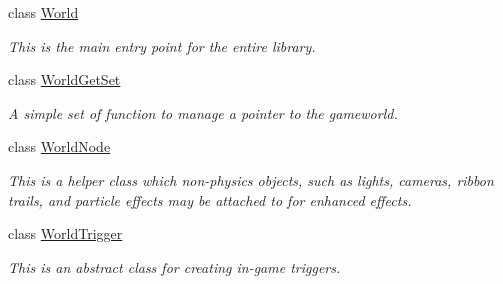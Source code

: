 \begin{DoxyCompactItemize}
class \hyperlink{classphys_1_1World}{World}
\begin{DoxyCompactList}\small\item\em This is the main entry point for the entire library. \item\end{DoxyCompactList}\item 
class \hyperlink{classphys_1_1WorldGetSet}{WorldGetSet}
\begin{DoxyCompactList}\small\item\em A simple set of function to manage a pointer to the gameworld. \item\end{DoxyCompactList}\item 
class \hyperlink{classphys_1_1WorldNode}{WorldNode}
\begin{DoxyCompactList}\small\item\em This is a helper class which non-\/physics objects, such as lights, cameras, ribbon trails, and particle effects may be attached to for enhanced effects. \item\end{DoxyCompactList}\item 
class \hyperlink{classphys_1_1WorldTrigger}{WorldTrigger}
\begin{DoxyCompactList}\small\item\em This is an abstract class for creating in-\/game triggers. \item\end{DoxyCompactList}\end{DoxyCompactItemize}
